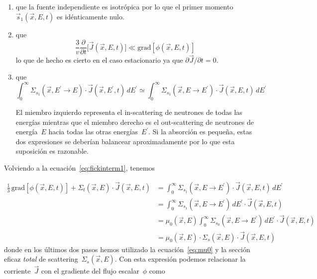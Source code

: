 \begin{enumerate}
 \item que la fuente independiente es isotrópica por lo que el primer momento $\vec{s}_1(\vec{x}, E, t)$ es idénticamente nulo.

 \item que
\begin{equation*}
 \frac{3}{v}  \frac{\partial}{\partial t}\Big[ \vec{J}(\vec{x}, E, t) \Big] \ll \text{grad} \left[ \phi(\vec{x}, E,t ) \right]
\end{equation*}
%
lo que de hecho es cierto en el caso estacionario ya que $\partial \vec{J}/\partial t = 0$.

 \item que
\begin{equation}\label{eq:suposicionscattering}
\int_0^\infty \Sigma_{s_1}(\vec{x}, E^\prime \rightarrow E) \cdot \vec{J}(\vec{x}, E^\prime, t) \, dE^\prime
\simeq
\int_0^\infty \Sigma_{s_1}(\vec{x}, E \rightarrow E^\prime) \cdot \vec{J}(\vec{x}, E, t) \, dE^\prime
\end{equation}

El miembro izquierdo representa el in-scattering de neutrones de todas las energías mientras que el miembro derecho es el out-scattering de neutrones de energía~$E$ hacia todas las otras energías~$E^\prime$. Si la absorción es pequeña, estas dos expresiones se deberían balancear aproximadamente por lo que esta suposición es razonable.

\end{enumerate}

Volviendo a la ecuación~\eqref{eq:fickinterm1}, tenemos

\begin{align*}
\frac{1}{3}  \, \text{grad} \left[ \phi(\vec{x}, E,t ) \right] +
\Sigma_t(\vec{x}, E) \cdot \vec{J}(\vec{x}, E, t)
& =
\int_0^\infty \Sigma_{s_1}(\vec{x}, E \rightarrow E^\prime) \cdot \vec{J}(\vec{x}, E, t) \, dE^\prime  \\
& =
\int_0^\infty \Sigma_{s_1}(\vec{x}, E \rightarrow E^\prime) \, dE^\prime \cdot \vec{J}(\vec{x}, E, t)  \\
& =
\mu_0(\vec{x}, E) \int_0^\infty \Sigma_{s_0}(\vec{x}, E \rightarrow E^\prime) \, dE^\prime \cdot \vec{J}(\vec{x}, E, t)  \\
& =
\mu_0(\vec{x}, E) \cdot \Sigma_s(\vec{x}, E) \cdot \vec{J}(\vec{x}, E, t)
\end{align*}
%
donde en los últimos dos pasos hemos utilizado la ecuación~\eqref{eq:mu0}  y la sección eficaz \emph{total} de scattering~$\Sigma_s(\vec{x}, E)$. Con esta expresión podemos relacionar la corriente~$\vec{J}$ con el gradiente del flujo escalar~$\phi$ como

